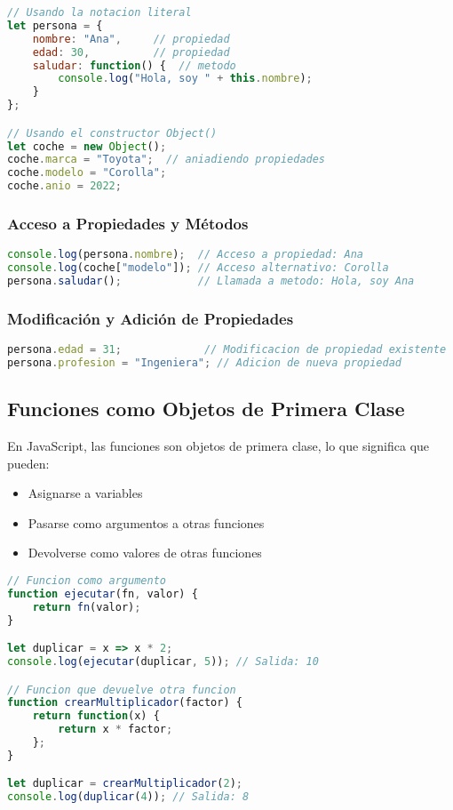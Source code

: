 \documentclass{book}
\begin{document}
\begin{lstlisting}[language=JavaScript]
// Usando la notacion literal
let persona = {
    nombre: "Ana",     // propiedad
    edad: 30,          // propiedad
    saludar: function() {  // metodo
        console.log("Hola, soy " + this.nombre);
    }
};

// Usando el constructor Object()
let coche = new Object();
coche.marca = "Toyota";  // aniadiendo propiedades
coche.modelo = "Corolla";
coche.anio = 2022;
\end{lstlisting}

\subsubsection{Acceso a Propiedades y Métodos}

\begin{lstlisting}[language=JavaScript]
console.log(persona.nombre);  // Acceso a propiedad: Ana
console.log(coche["modelo"]); // Acceso alternativo: Corolla
persona.saludar();            // Llamada a metodo: Hola, soy Ana
\end{lstlisting}

\subsubsection{Modificación y Adición de Propiedades}

\begin{lstlisting}[language=JavaScript]
persona.edad = 31;             // Modificacion de propiedad existente
persona.profesion = "Ingeniera"; // Adicion de nueva propiedad
\end{lstlisting}

\subsection{Funciones como Objetos de Primera Clase}

En JavaScript, las funciones son objetos de primera clase, lo que significa que pueden:

\begin{itemize}
    \item Asignarse a variables
    \item Pasarse como argumentos a otras funciones
    \item Devolverse como valores de otras funciones
\end{itemize}

\begin{lstlisting}[language=JavaScript]
// Funcion como argumento
function ejecutar(fn, valor) {
    return fn(valor);
}

let duplicar = x => x * 2;
console.log(ejecutar(duplicar, 5)); // Salida: 10

// Funcion que devuelve otra funcion
function crearMultiplicador(factor) {
    return function(x) {
        return x * factor;
    };
}

let duplicar = crearMultiplicador(2);
console.log(duplicar(4)); // Salida: 8
\end{lstlisting}
\end{document}
